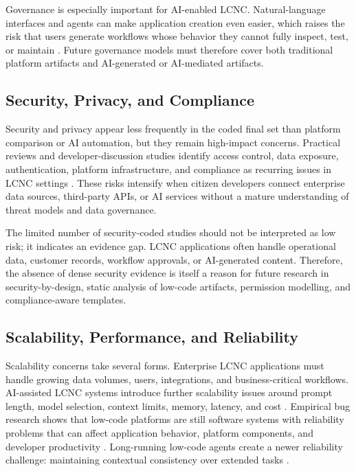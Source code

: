 \documentclass[conference]{IEEEtran}
\begin{document}
Governance is especially important for AI-enabled LCNC. Natural-language interfaces and agents can make application creation even easier, which raises the risk that users generate workflows whose behavior they cannot fully inspect, test, or maintain \cite{p06,p31,p32,p42}. Future governance models must therefore cover both traditional platform artifacts and AI-generated or AI-mediated artifacts.

\subsection{Security, Privacy, and Compliance}
Security and privacy appear less frequently in the coded final set than platform comparison or AI automation, but they remain high-impact concerns. Practical reviews and developer-discussion studies identify access control, data exposure, authentication, platform infrastructure, and compliance as recurring issues in LCNC settings \cite{p28,p30}. These risks intensify when citizen developers connect enterprise data sources, third-party APIs, or AI services without a mature understanding of threat models and data governance.

The limited number of security-coded studies should not be interpreted as low risk; it indicates an evidence gap. LCNC applications often handle operational data, customer records, workflow approvals, or AI-generated content. Therefore, the absence of dense security evidence is itself a reason for future research in security-by-design, static analysis of low-code artifacts, permission modelling, and compliance-aware templates.

\subsection{Scalability, Performance, and Reliability}
Scalability concerns take several forms. Enterprise LCNC applications must handle growing data volumes, users, integrations, and business-critical workflows. AI-assisted LCNC systems introduce further scalability issues around prompt length, model selection, context limits, memory, latency, and cost \cite{p05,p38,p41}. Empirical bug research shows that low-code platforms are still software systems with reliability problems that can affect application behavior, platform components, and developer productivity \cite{p26}. Long-running low-code agents create a newer reliability challenge: maintaining contextual consistency over extended tasks \cite{p41}.
\end{document}
